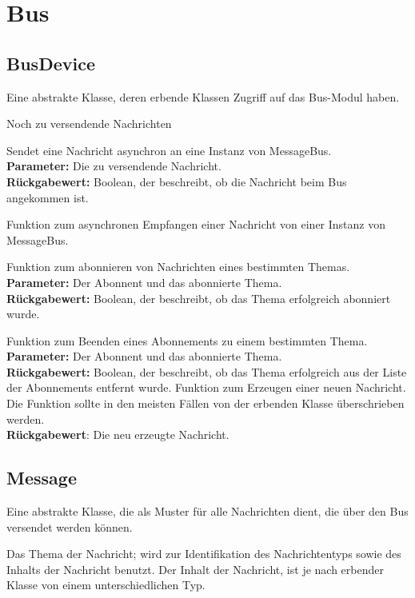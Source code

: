 \documentclass[entwurf.tex]{subfiles}
\begin{document}
		
	
	\section{Bus}
	\subsection{BusDevice}
	\label{Class:BusDevice} 
		Eine abstrakte Klasse, deren erbende Klassen Zugriff auf das Bus-Modul haben.
		\begin{description}
				Noch zu versendende Nachrichten
			
				Sendet eine Nachricht asynchron an eine Instanz von MessageBus.\\ 
				\textbf{Parameter:} Die zu versendende Nachricht.\\ 
				\textbf{Rückgabewert:} Boolean, der beschreibt, ob die Nachricht beim Bus angekommen ist.
				
				Funktion zum asynchronen Empfangen einer Nachricht von einer Instanz von MessageBus.
				
				Funktion zum abonnieren von Nachrichten eines bestimmten Themas.\\ 
				\textbf{Parameter:} Der Abonnent und das abonnierte Thema.\\ 
				\textbf{Rückgabewert:} Boolean, der beschreibt, ob das Thema erfolgreich abonniert wurde.
				
				Funktion zum Beenden eines Abonnements zu einem bestimmten Thema.\\ 
				\textbf{Parameter:} Der Abonnent und das abonnierte Thema.\\ 
				\textbf{Rückgabewert:} Boolean, der beschreibt, ob das Thema erfolgreich aus der Liste der Abonnements entfernt wurde.
				Funktion zum Erzeugen einer neuen Nachricht. Die Funktion sollte in den meisten Fällen von der erbenden Klasse überschrieben werden. \\
				\textbf{Rückgabewert}: Die neu erzeugte Nachricht.
		\end{description}
  		
	\subsection{Message}
	\label{Class:Message} 
		Eine abstrakte Klasse, die als Muster für alle Nachrichten dient, die über den Bus versendet werden können.
		\begin{description}
			\attr{protected topic: Topic}  
				Das Thema der Nachricht; wird zur Identifikation des Nachrichtentyps sowie des Inhalts der Nachricht benutzt.
			\attr{Inhalt}
				Der Inhalt der Nachricht, ist je nach erbender Klasse von einem unterschiedlichen Typ.
		\end{description}
\end{document}
